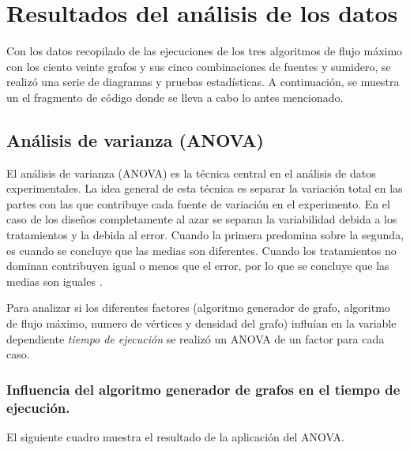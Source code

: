 \documentclass{article}
\begin{document}
\section{Resultados del análisis de los datos}

Con los datos recopilado de las ejecuciones de los tres algoritmos de flujo máximo con los ciento veinte grafos y sus cinco combinaciones de fuentes y sumidero, se realizó una serie de diagramas y pruebas estadísticas. A continuación, se muestra un el fragmento de código donde se lleva a cabo lo antes mencionado.

 
\begin{center}

\end{center}
\subsection{Análisis de varianza (ANOVA)}
El análisis de varianza (ANOVA) es la técnica central en el análisis de datos experimentales. La idea general de esta técnica es separar la variación total en las partes con las que contribuye cada fuente de variación en el experimento. En el caso de los diseños completamente al azar se separan la variabilidad debida a los tratamientos y la debida al error. Cuando la primera predomina sobre la segunda, es cuando se concluye que las medias son diferentes. Cuando los tratamientos no dominan contribuyen igual o menos que el error, por lo que se concluye que las medias son iguales \cite{ade}.

Para analizar si los diferentes factores (algoritmo generador de grafo, algoritmo de flujo máximo, numero de vértices y densidad del grafo) influían en la variable dependiente \textit{tiempo de ejecución} se realizó un ANOVA de un factor para cada caso. 

\subsubsection{Influencia del algoritmo generador de grafos en el tiempo de ejecución.}
El siguiente cuadro muestra el resultado de la aplicación del ANOVA.
\end{document}
